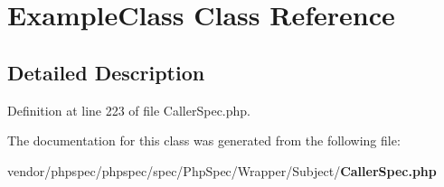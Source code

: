 \section{Example\+Class Class Reference}
\label{classspec_1_1_php_spec_1_1_wrapper_1_1_subject_1_1_example_class}


\subsection{Detailed Description}


Definition at line 223 of file Caller\+Spec.\+php.



The documentation for this class was generated from the following file\+:\begin{DoxyCompactItemize}
\item 
vendor/phpspec/phpspec/spec/\+Php\+Spec/\+Wrapper/\+Subject/{\bf Caller\+Spec.\+php}\end{DoxyCompactItemize}
